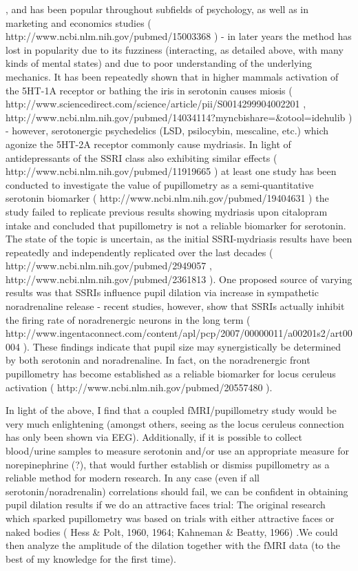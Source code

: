 	
, and has been popular throughout subfields of psychology, as well as in marketing and economics studies ( http://www.ncbi.nlm.nih.gov/pubmed/15003368 ) - in later years the method has lost in popularity due to its fuzziness (interacting, as detailed above, with many kinds of mental states) and due to poor understanding of the underlying mechanics. It has been repeatedly shown that in higher mammals activation of the 5HT-1A receptor or bathing the iris in serotonin causes miosis ( http://www.sciencedirect.com/science/article/pii/S0014299904002201 , http://www.ncbi.nlm.nih.gov/pubmed/14034114?myncbishare=&otool=idehulib ) - however, serotonergic psychedelics (LSD, psilocybin, mescaline, etc.) which agonize the 5HT-2A receptor commonly cause mydriasis. In light of antidepressants of the SSRI class also exhibiting similar effects ( http://www.ncbi.nlm.nih.gov/pubmed/11919665 ) at least one study has been conducted to investigate the value of pupillometry as a semi-quantitative serotonin biomarker ( http://www.ncbi.nlm.nih.gov/pubmed/19404631 ) the study failed to replicate previous results showing mydriasis upon citalopram intake and concluded that pupillometry is not a reliable biomarker for serotonin. The state of the topic is uncertain, as the initial SSRI-mydriasis results have been repeatedly and independently replicated over the last decades ( http://www.ncbi.nlm.nih.gov/pubmed/2949057 , http://www.ncbi.nlm.nih.gov/pubmed/2361813 ). One proposed source of varying results was that SSRIs influence pupil dilation via increase in sympathetic noradrenaline release - recent studies, however, show that SSRIs actually inhibit the firing rate of noradrenergic neurons in the long term ( http://www.ingentaconnect.com/content/apl/pcp/2007/00000011/a00201s2/art00004 ). These findings indicate that pupil size may synergistically be determined by both serotonin and noradrenaline. In fact, on the noradrenergic front pupillometry has become established as a reliable biomarker for locus ceruleus activation ( http://www.ncbi.nlm.nih.gov/pubmed/20557480 ).

	In light of the above, I find that a coupled fMRI/pupillometry study would be very much enlightening (amongst others, seeing as the locus ceruleus connection has only been shown via EEG). Additionally, if it is possible to collect blood/urine samples to measure serotonin and/or use an appropriate measure for norepinephrine (?), that would further establish or dismiss pupillometry as a reliable method for modern research. In any case (even if all serotonin/noradrenalin) correlations should fail, we can be confident in obtaining pupil dilation results if we do an attractive faces trial: The original research which sparked pupillometry was based on trials with either attractive faces or naked bodies ( Hess & Polt, 1960, 1964; Kahneman & Beatty, 1966) .We could  then analyze the amplitude of the dilation together with the fMRI data (to the best of my knowledge for the first time).

